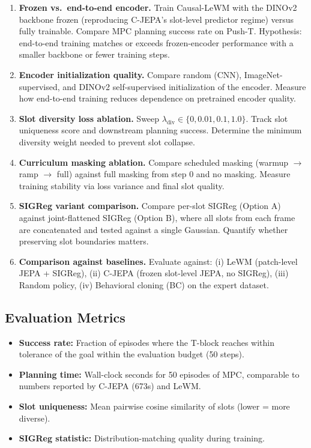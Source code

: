 \documentclass[12pt]{article}
\begin{document}
\begin{enumerate}[label=\textbf{A\arabic*:}, leftmargin=*]

    \item \textbf{Frozen vs.\ end-to-end encoder.} Train Causal-LeWM with the DINOv2 backbone frozen (reproducing C-JEPA's slot-level predictor regime) versus fully trainable. Compare MPC planning success rate on Push-T. Hypothesis: end-to-end training matches or exceeds frozen-encoder performance with a smaller backbone or fewer training steps.

    \item \textbf{Encoder initialization quality.} Compare random (CNN), ImageNet-supervised, and DINOv2 self-supervised initialization of the encoder. Measure how end-to-end training reduces dependence on pretrained encoder quality.

    \item \textbf{Slot diversity loss ablation.} Sweep $\lambda_{\text{div}} \in \{0, 0.01, 0.1, 1.0\}$. Track slot uniqueness score and downstream planning success. Determine the minimum diversity weight needed to prevent slot collapse.

    \item \textbf{Curriculum masking ablation.} Compare scheduled masking (warmup $\rightarrow$ ramp $\rightarrow$ full) against full masking from step 0 and no masking. Measure training stability via loss variance and final slot quality.

    \item \textbf{SIGReg variant comparison.} Compare per-slot SIGReg (Option A) against joint-flattened SIGReg (Option B), where all slots from each frame are concatenated and tested against a single Gaussian. Quantify whether preserving slot boundaries matters.

    \item \textbf{Comparison against baselines.} Evaluate against: (i) LeWM (patch-level JEPA + SIGReg), (ii) C-JEPA (frozen slot-level JEPA, no SIGReg), (iii) Random policy, (iv) Behavioral cloning (BC) on the expert dataset.

\end{enumerate}

\subsection{Evaluation Metrics}

\begin{itemize}[leftmargin=*]
    \item \textbf{Success rate:} Fraction of episodes where the T-block reaches within tolerance of the goal within the evaluation budget (50 steps).
    \item \textbf{Planning time:} Wall-clock seconds for 50 episodes of MPC, comparable to numbers reported by C-JEPA (673s) and LeWM.
    \item \textbf{Slot uniqueness:} Mean pairwise cosine similarity of slots (lower = more diverse).
    \item \textbf{SIGReg statistic:} Distribution-matching quality during training.
\end{itemize}
\end{document}
